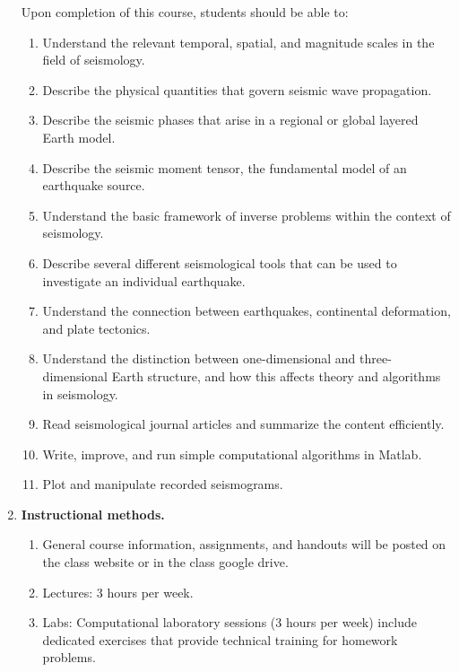 \documentclass[10pt,titlepage,fleqn]{article}
\begin{document}
\begin{enumerate}
Upon completion of this course, students should be able to:
%
\begin{enumerate}
\item Understand the relevant temporal, spatial, and magnitude scales in the field of seismology.
\item Describe the physical quantities that govern seismic wave propagation.
\item Describe the seismic phases that arise in a regional or global layered Earth model.
\item Describe the seismic moment tensor, the fundamental model of an earthquake source.
\item Understand the basic framework of inverse problems within the context of seismology.
\item Describe several different seismological tools that can be used to investigate an individual earthquake.
\item Understand the connection between earthquakes, continental deformation, and plate tectonics.
\item Understand the distinction between one-dimensional and three-dimensional Earth structure, and how this affects theory and algorithms in seismology.
\item Read seismological journal articles and summarize the content efficiently.
\item Write, improve, and run simple computational algorithms in Matlab.
\item Plot and manipulate recorded seismograms.
\end{enumerate}

\item {\bf Instructional methods.}

\begin{enumerate}
\item General course information, assignments, and handouts will be posted on the class website or in the class google drive.
\item Lectures: 3 hours per week.
\item Labs: Computational laboratory sessions (3 hours per week) include dedicated exercises that provide technical training for homework problems.
\end{enumerate}


\end{enumerate}
\end{document}
